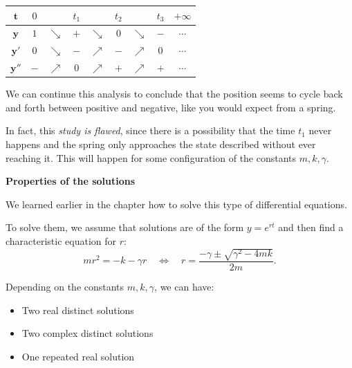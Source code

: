 \begin{graybox}
\begin{center}
\begin{tabular}{c||c|c|c|c|c|c|c|c}
$\pmb{t}$	& $0$ 		& 			& $t_1$ &  			&	$t_2$& 	&$t_3$	& \hspace{1cm} $+\infty$ \\[5pt] \hline\hline
$\pmb{y}$ & $1$	& $ \searrow$	& $+$ &	$\searrow$ 	& $0$	&  $\searrow$ 	& $-$ 	& $\cdots$	\\[5pt] \hline
$\pmb{y'}$ & $0$ &	$\searrow$	& $-$ & $\nearrow$ & $-$	&  $\nearrow$	& $0$ &	$\cdots$ \\[5pt] \hline
$\pmb{y''}$ & $-$		& $\nearrow$ & 0  & $\nearrow$  & $+$ & $\nearrow$	& $+$ &	$ \cdots$ \\[5pt] \hline
\end{tabular}
\end{center}
\end{graybox}

We can continue this analysis to conclude that the position seems to cycle back and forth between positive and negative, like you would expect from a spring. \\

\begin{graybox}
In fact, this \emph{study is flawed}, since there is a possibility that the time $t_1$ never happens and the spring only approaches the state described without ever reaching it. This will happen for some configuration of the constants $m,k,\gamma$.
\end{graybox}




\hfill

\begin{center}
\textbf{\color{cyan}
Properties of the solutions
}
\end{center}



We learned earlier in the chapter how to solve this type of differential equations.

To solve them, we assume that solutions are of the form $y=e^{rt}$ and then find a characteristic equation for $r$:
$$
mr^2 = -k - \gamma r
\quad \Leftrightarrow \quad 
r = \frac{-\gamma \pm \sqrt{\gamma^2 - 4mk}}{2m}.
$$

Depending on the constants $m, k, \gamma$, we can have:
\begin{itemize}
	\item Two real distinct solutions 
	\item Two complex distinct solutions
	\item One repeated real solution
\end{itemize}

